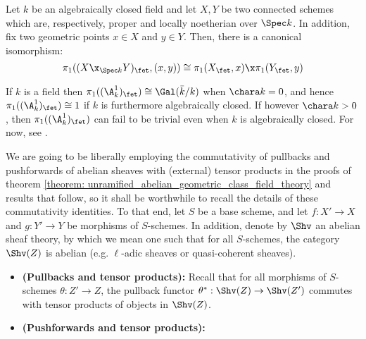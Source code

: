        \begin{proposition}
                \cite[Corollaire 1.7]{SGA1} Let $k$ be an algebraically closed field and let $X, Y$ be two connected schemes which are, respectively, proper and locally noetherian over $\Spec k$. In addition, fix two geometric points $x \in X$ and $y \in Y$. Then, there is a canonical isomorphism:
                    $$\pi_1((X \x_{\Spec k} Y)_{\fet}, (x, y)) \cong \pi_1(X_{\fet}, x) \x \pi_1(Y_{\fet}, y)$$
            \end{proposition}
            
            
            \begin{example} \label{example: etale_fundamental_group_of_the_affine_line}
                If $k$ is a field then $\pi_1((\A^1_k)_{\fet}) \cong \Gal(\bar{k}/k)$ when $\chara k = 0$, and hence $\pi_1((\A^1_k)_{\fet}) \cong 1$ if $k$ is furthermore algebraically closed. If however $\chara k > 0$, then $\pi_1((\A^1_k)_{\fet})$ can fail to be trivial even when $k$ is algebraically closed. For now, see \cite[Theorem 6.13, Remark 6.23, and Exercises 6.28 and 6.29]{lenstra_1985_galois_theory_for_schemes}.
            \end{example}
            
    \begin{remark} \label{remark: pullbacks_pushforwards_and_tensor_products}
            We are going to be liberally employing the commutativity of pullbacks and pushforwards of abelian sheaves with (external) tensor products in the proofs of theorem \ref{theorem: unramified_abelian_geometric_class_field_theory} and results that follow, so it shall be worthwhile to recall the details of these commutativity identities. To that end, let $S$ be a base scheme, and let $f: X' \to X$ and $g: Y' \to Y$ be morphisms of $S$-schemes. In addition, denote by $\Shv$ an abelian sheaf theory, by which we mean one such that for all $S$-schemes, the category $\Shv(Z)$ is abelian (e.g. $\ell$-adic sheaves or quasi-coherent sheaves).
            \begin{itemize}
                \item \textbf{(Pullbacks and tensor products):} Recall that for all morphisms of $S$-schemes $\theta: Z' \to Z$, the pullback functor $\theta^*: \Shv(Z) \to \Shv(Z')$ commutes with tensor products of objects in $\Shv(Z)$. 
                \item \textbf{(Pushforwards and tensor products):}
            \end{itemize}
        \end{remark}